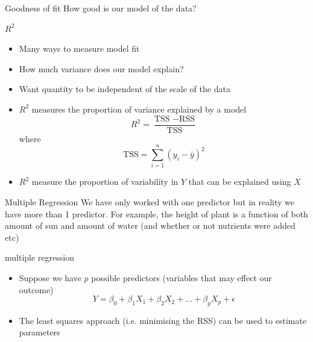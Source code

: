 \documentclass{bredelebeamer}
\begin{document}
\begin{frame}{Goodness of fit}
How good is our model of the data?
\begin{exampleblock}{$R^2$}
	\begin{itemize}
		\item Many ways to measure model fit 
		\item How much variance does our model explain?
		\item Want quantity to be independent of the scale of the data
		\item $R^2$ measures the proportion of variance explained by a model
		\begin{equation}
		R^2 = \frac{\text{TSS } - \text{RSS}}{\text{TSS}}
		\end{equation}
		where
		\begin{equation}
		\text{TSS} = \sum_{i = 1}^{n} (y_i - \bar{y})^2
		\end{equation}
		\item $R^2$ measure the proportion of variability in $Y$ that can be explained using $X$
		\end{itemize}
\end{exampleblock}
\end{frame}

\begin{frame}{Multiple Regression}
We have only worked with one predictor but in reality we have more than 1 predictor. For example, the height of plant is a function of both amount of sun and amount of water (and whether or not nutrients were added etc)
\begin{exampleblock}{multiple regression}
\begin{itemize}
\item Suppose we have $p$ possible predictors (variables that may effect our outcome)
\begin{equation}
Y = \beta_0 + \beta_1X_1 + \beta_2X_2 + ... + \beta_p X_p + \epsilon
\end{equation}
\item The least squares approach (i.e. minimising the RSS) can be used to estimate parameters
\end{itemize}
\end{exampleblock}
\end{frame}
\end{document}
